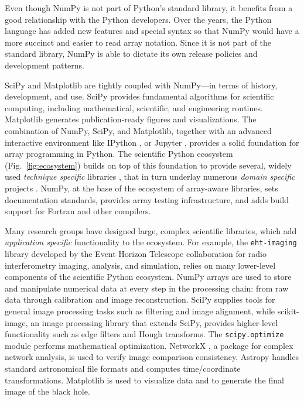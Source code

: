 Even though NumPy is not part of Python's standard library,
it benefits from a good relationship with the Python developers.
Over the years, the Python language has added new features and
special syntax so that NumPy would have a more succinct and 
easier to read array notation.
Since it is not part of the standard library, NumPy is able to
dictate its own release policies and development patterns.

SciPy and Matplotlib are tightly coupled with NumPy---in terms of
history, development, and use.
SciPy provides fundamental algorithms for scientific computing,
including mathematical, scientific, and engineering routines.
Matplotlib generates publication-ready figures and visualizations.
The combination of NumPy, SciPy, and Matplotlib, together with
an advanced interactive environment like IPython \cite{perez2007ipython},
or Jupyter \cite{Kluyver:2016aa}, provides a solid foundation for array
programming in Python.
The scientific Python ecosystem (Fig.~\ref{fig:ecosystem}) builds on top of
this foundation to provide several, widely used \emph{technique specific}
libraries \cite{pedregosa2011scikit,vanderwalt2014scikit,SciPyProceedings_11},
that in turn underlay numerous \emph{domain specific} projects
\cite{astropy:2013,astropy:2018,cock2009biopython,millman2007analysis,sunpy2015,2018EGUGA..2012146H}.
NumPy, at the base of the ecosystem of array-aware libraries,
sets documentation standards, provides array testing infrastructure,
and adds build support for Fortran and other compilers.

Many research groups have designed large,
complex scientific libraries, which add \emph{application specific} functionality
to the ecosystem.
For example, the \texttt{eht-imaging} library \cite{chael2019ehtim} developed by
the Event Horizon Telescope collaboration for radio interferometry imaging,
analysis, and simulation, relies on many lower-level components of the scientific Python
ecosystem.
NumPy arrays are used to store and manipulate numerical data at every step
in the processing chain: from raw data through calibration and image
reconstruction.
SciPy supplies tools for general image processing tasks such as
filtering and image alignment, while scikit-image, an image processing
library that extends SciPy, provides higher-level functionality such as
edge filters and Hough transforms.
The \texttt{scipy.optimize} module performs mathematical optimization.
NetworkX \cite{SciPyProceedings_11}, a package for complex
network analysis, is used to verify image comparison consistency.
Astropy \cite{astropy:2013, astropy:2018} handles standard
astronomical file formats and computes time/coordinate transformations.
Matplotlib is used to visualize data and to generate the final image of the black hole.


